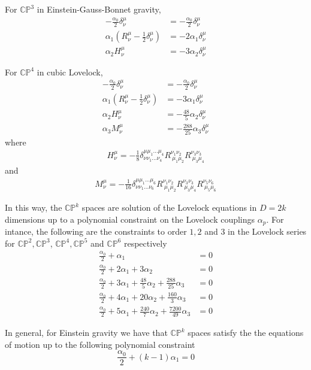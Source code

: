 For $\mathbb{CP}^3$ in Einstein-Gauss-Bonnet gravity,
\begin{align*}
    -\frac{\alpha_0}{2}\delta^\mu_\nu&=-\frac{\alpha_0}{2}\delta^\mu_\nu\\
    \alpha_1\left(R^\mu_\nu-\frac{1}{2}\delta^\mu_\nu\right)&=-2\alpha_1\delta^\mu_\nu\\
    \alpha_2 H^\mu_\nu&=-3\alpha_2\delta^\mu_\nu
\end{align*}

For $\mathbb{CP}^4$ in cubic Lovelock,
\begin{align*}
    -\frac{\alpha_0}{2}\delta^\mu_\nu&=-\frac{\alpha_0}{2}\delta^\mu_\nu\\
    \alpha_1\left(R^\mu_\nu-\frac{1}{2}\delta^\mu_\nu\right)&=-3\alpha_1\delta^\mu_\nu\\
    \alpha_2 H^\mu_\nu&=-\frac{48}{5}\alpha_2\delta^\mu_\nu\\
    \alpha_3M^\mu_\nu&=-\frac{288}{25}\alpha_3\delta^\mu_\nu
\end{align*}
where
\begin{align*}
    H^\mu_\nu=-\frac{1}{8}\delta^{\mu\mu_1...\mu_4}_{\nu\nu_1...\nu_4}R^{\nu_1\nu_2}_{\  \mu_1\mu_2}R^{\nu_3\nu_3}_{\  \mu_3\mu_4}
\end{align*}
and
\begin{align*}
    M^\mu_\nu=-\frac{1}{16}\delta^{\mu\mu_1...\mu_6}_{\nu\nu_1...\nu_6}R^{\nu_1\nu_2}_{\  \mu_1\mu_2}R^{\nu_3\nu_3}_{\  \mu_3\mu_4}R^{\nu_5\nu_6}_{\  \mu_5\mu_6}
\end{align*}

In this way, the $\mathbb{CP}^k$ spaces are solution of the Lovelock equations in $D=2k$ dimensions up to a polynomial constraint on the Lovelock couplings $\alpha_p$. For intance, the following are the constraints to order $1,2$ and $3$ in the Lovelock series for $\mathbb{CP}^2,\mathbb{CP}^3$, $\mathbb{CP}^4,\mathbb{CP}^5$ and $\mathbb{CP}^6$ respectively
\begin{align*}
    \frac{\alpha_0}{2}+\alpha_1&=0\\
    \frac{\alpha_0}{2}+2\alpha_1+3\alpha_2&=0\\
    \frac{\alpha_0}{2}+3\alpha_1+\frac{48}{5}\alpha_2+\frac{288}{25}\alpha_3&=0\\
    \frac{\alpha_0}{2}+4\alpha_1+20\alpha_2+\frac{160}{3}\alpha_3&=0\\
    \frac{\alpha_0}{2}+5\alpha_1+\frac{240}{7}\alpha_2+\frac{7200}{49}\alpha_3&=0
\end{align*}

In general, for Einstein gravity we have that $\mathbb{CP}^k$ spaces satisfy the the equations of motion up to the following polynomial constraint
\begin{equation*}
    \frac{\alpha_0}{2}+(k-1)\alpha_1=0
\end{equation*}

